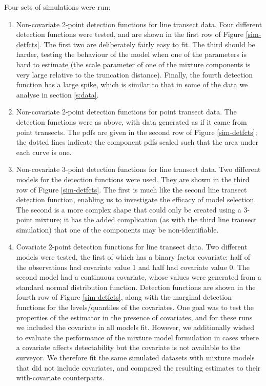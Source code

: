 \documentclass[useAMS,referee, usegraphicx]{biom}
\begin{document}
Four sets of simulations were run:
\begin{enumerate}
	\item Non-covariate 2-point detection functions for line transect data. Four different detection functions were tested, and are shown in the first row of Figure \ref{sim-detfcts}. The first two are deliberately fairly easy to fit. The third should be harder, testing the behaviour of the model when one of the parameters is hard to estimate (the scale parameter of one of the mixture components is very large relative to the truncation distance). Finally, the fourth detection function has a large spike, which is similar to that in some of the data we analyse in section \ref{s:data}.
	\item Non-covariate 2-point detection functions for point transect data.  The detection functions were as above, with data generated as if it came from point transects. The pdfs are given in the second row of Figure \ref{sim-detfcts}; the dotted lines indicate the component pdfs scaled such that the area under each curve is one.
	\item Non-covariate 3-point detection functions for line transect data. Two different models for the detection functions were used. They are shown in the third row of Figure \ref{sim-detfcts}. The first is much like the second line transect detection function, enabling us to investigate the efficacy of model selection. The second is a more complex shape that could only be created using a 3-point mixture; it has the added complication (as with the third line transect simulation) that one of the components may be non-identifiable.
	\item Covariate 2-point detection functions for line transect data. Two different models were tested, the first of which has a binary factor covariate: half of the observations had covariate value 1 and half had covariate value 0. The second model had a continuous covariate, whose values were generated from a standard normal distribution function. Detection functions are shown in the fourth row of Figure \ref{sim-detfcts}, along with the marginal detection functions for the levels/quantiles of the covariates. One goal was to test the properties of the estimator in the presence of covariates, and for these runs we included the covariate in all models fit.  However, we additionally wished to evaluate the performance of the mixture model formulation in cases where a covariate affects detectability but the covariate is not available to the surveyor.  We therefore fit the same simulated datasets with mixture models that did not include covariates, and compared the resulting estimates to their with-covariate counterparts.
\end{enumerate}
\end{document}
